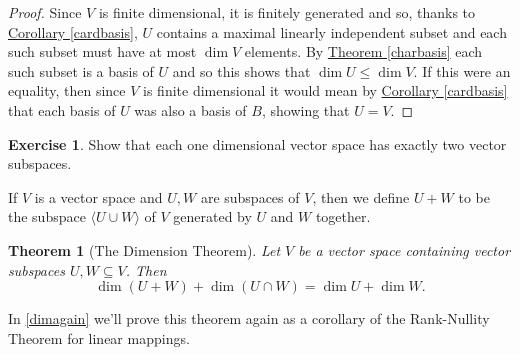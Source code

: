\documentclass[11pt]{amsbook}
\newtheorem{theorem}{Theorem}[section]
\theoremstyle{definition}
\newtheorem{exercise}{Exercise}
\begin{document}
\begin{proof}
 Since $V$ is finite dimensional, it is finitely generated and so, thanks to \hyperref[cardbasis]{Corollary \ref{cardbasis}}, $U$ contains a maximal linearly independent subset and each such subset must have at most $\dim V$ elements. By \hyperref[charbasis]{Theorem \ref{charbasis}} each such subset is a basis of $U$ and so this shows that $\dim U \leqslant \dim V$. If this were an equality, then since $V$ is finite dimensional it would mean by \hyperref[cardbasis]{Corollary \ref{cardbasis}} that each basis of $U$ was also a basis of $B$, showing that $U=V$.
\end{proof}

\begin{exercise} Show that each one dimensional vector space has exactly two vector subspaces.
\end{exercise}

If $V$ is a vector space and $U,W$ are subspaces of $V$, then we define $U+W$ to be the subspace $\langle U\cup W \rangle$ of $V$ generated by $U$ and $W$ together.

\begin{theorem}[The Dimension Theorem] \label{dimthm} Let $V$ be a vector space containing vector subspaces $U,W \subseteq V$. Then $$\dim (U+W) + \dim (U\cap W) = \dim U + \dim W.$$
\end{theorem}

In \ref{dimagain} we'll prove this theorem again as a corollary of the Rank-Nullity Theorem for linear mappings.
\end{document}

